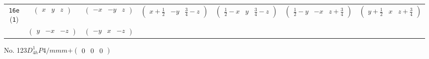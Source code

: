 \documentclass[fleqn,9pt,landscape]{jsarticle}
\begin{document}
\begin{center}
\begin{longtable}{ccccccc}
{\tt 16e} ({\tt 1}) & $ \begin{pmatrix} x & y & z \end{pmatrix} $ & $ \begin{pmatrix} - x & - y & z \end{pmatrix} $ & $ \begin{pmatrix} x + \frac{1}{2} & - y & \frac{3}{4} - z \end{pmatrix} $ & $ \begin{pmatrix} \frac{1}{2} - x & y & \frac{3}{4} - z \end{pmatrix} $ & $ \begin{pmatrix} \frac{1}{2} - y & - x & z + \frac{3}{4} \end{pmatrix} $ & $ \begin{pmatrix} y + \frac{1}{2} & x & z + \frac{3}{4} \end{pmatrix} $ \\
& $ \begin{pmatrix} y & - x & - z \end{pmatrix} $ & $ \begin{pmatrix} - y & x & - z \end{pmatrix} $ & $  $ & $  $ & $  $ & $  $ \\
\end{longtable}
\end{center}
\newpage
No. 123\quad$D_{4h}^{1}$\quad$P4/mmm$\quad[ tetragonal ]\quad$+\begin{pmatrix} 0 & 0 & 0 \end{pmatrix}$
\end{document}
